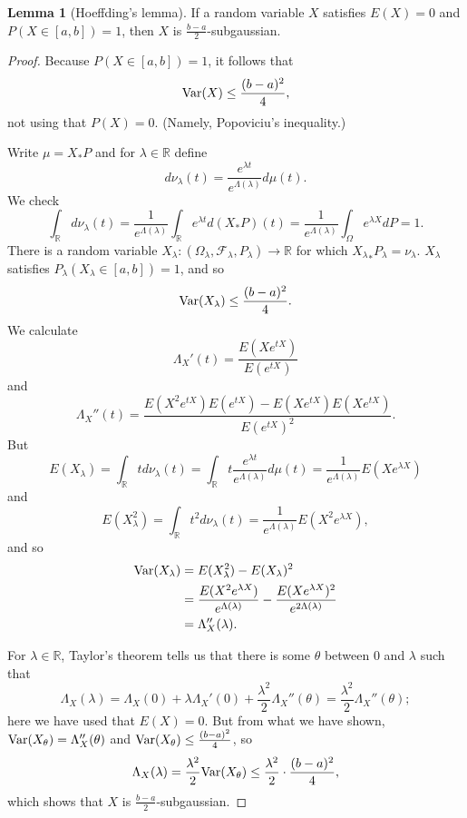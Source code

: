 \documentclass{article}
\newcommand{\Var}{\ensuremath\mathrm{Var}}
\theoremstyle{definition}
\newtheorem{lemma}[theorem]{Lemma}
\theoremstyle{definition}
\begin{document}
\begin{lemma}[Hoeffding's lemma]
If a random variable $X$ satisfies $E(X)=0$ and $P(X \in [a,b])=1$, then $X$ is $\frac{b-a}{2}$-subgaussian.
\end{lemma}
\begin{proof}
Because $P(X \in [a,b]) =1$, it follows that
\[
\Var(X) \leq \frac{(b-a)^2}{4},
\]
not using that $P(X)=0$. (Namely, Popoviciu's inequality.)

Write $\mu = X_*P$
and for $\lambda \in \mathbb{R}$ define
\[
d\nu_\lambda(t) = \frac{e^{\lambda t}}{e^{\Lambda(\lambda)}} d\mu(t).
\]
We check
\[
\int_\mathbb{R} d\nu_\lambda(t) =\frac{1}{e^{\Lambda(\lambda)}} \int_\mathbb{R} 
e^{\lambda t} d(X_*P)(t)
=\frac{1}{e^{\Lambda(\lambda)}} \int_\Omega e^{\lambda X} dP
=1.
\]
There is a random variable $X_\lambda:(\Omega_\lambda,\mathscr{F}_\lambda,P_\lambda) \to \mathbb{R}$ for which ${X_\lambda}_*P_\lambda=\nu_\lambda$. 
$X_\lambda$ satisfies $P_\lambda(X_\lambda \in [a,b])=1$, and so 
\[
\Var(X_\lambda) \leq \frac{(b-a)^2}{4}.
\]
We calculate
\[
\Lambda_X'(t) = \frac{E(Xe^{tX})}{E(e^{tX})}
\]
and
\[
\Lambda_X''(t) = \frac{E(X^2 e^{tX}) E(e^{tX}) - E(Xe^{tX})E(Xe^{tX})}{E(e^{tX})^2}.
\]
But
\[
E(X_\lambda) =\int_\mathbb{R} t d\nu_\lambda(t) 
=\int_\mathbb{R} t \frac{e^{\lambda t}}{e^{\Lambda(\lambda)}} d\mu(t)
=\frac{1}{e^{\Lambda(\lambda)}} E(Xe^{\lambda X})
\]
and
\[
E(X_\lambda^2) = \int_\mathbb{R} t^2 d\nu_\lambda(t) = \frac{1}{e^{\Lambda(\lambda)}} E(X^2 e^{\lambda X}),
\]
and so
\begin{align*}
\Var(X_\lambda)& =E(X_\lambda^2)-E(X_\lambda)^2\\
&= \frac{E(X^2 e^{\lambda X})}{e^{\Lambda(\lambda)}}  - \frac{E(Xe^{\lambda X})^2}{e^{2\Lambda(\lambda)}}\\
&=\Lambda_X''(\lambda).
\end{align*}

For $\lambda \in \mathbb{R}$, Taylor's theorem tells us that there is some $\theta$ between $0$ and $\lambda$ such that
\[
\Lambda_X(\lambda) = \Lambda_X(0)+\lambda \Lambda_X'(0)
+\frac{\lambda^2}{2} \Lambda_X''(\theta)
=\frac{\lambda^2}{2} \Lambda_X''(\theta);
\]
here we have used that $E(X)=0$.
But from what we have shown, $\Var(X_\theta)=\Lambda_X''(\theta)$ and $\Var(X_\theta) \leq \frac{(b-a)^2}{4}$, so
\[
\Lambda_X(\lambda)  = \frac{\lambda^2}{2} \Var(X_\theta) \leq 
\frac{\lambda^2}{2} \cdot \frac{(b-a)^2}{4},
\] 
which shows that $X$ is $\frac{b-a}{2}$-subgaussian.
\end{proof}
\end{document}
